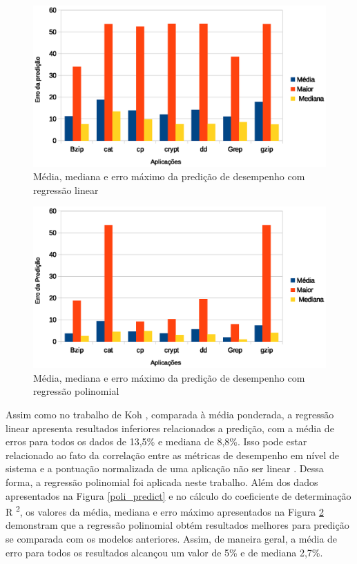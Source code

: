 \begin{figure}[!htb]
\centering
\includegraphics[width=.5\textwidth]{graficos/linear_error.eps}
\caption{Média, mediana e erro máximo da predição de desempenho com regressão linear}
\label{linear_error}
\end{figure}  

\begin{figure}[!htb]
\centering
\includegraphics[width=.5\textwidth]{graficos/polinomial_error.eps}
\caption{Média, mediana e erro máximo da predição de desempenho com regressão polinomial}
\label{polinomial_error}
\end{figure}  


Assim como no trabalho de Koh \cite{koh2007}, comparada à média ponderada, a
regressão linear apresenta resultados inferiores relacionados a predição, com a
média de erros para todos os dados de 13,5\% e mediana de 8,8\%. Isso pode
estar relacionado ao fato da correlação entre as métricas de desempenho em
nível de sistema e a pontuação normalizada de uma aplicação não ser linear
\cite{koh2007}. Dessa forma, a regressão polinomial foi aplicada neste
trabalho. Além dos dados apresentados na Figura \ref{poli_predict} e no cálculo
do coeficiente de determinação R \textsuperscript{2}, os valores da média,
mediana e erro máximo apresentados na Figura \ref{polinomial_error} demonstram
que a regressão polinomial obtém resultados melhores para predição se comparada
com os modelos anteriores. Assim, de maneira geral, a média de erro para todos
os resultados alcançou um valor de 5\% e de mediana 2,7\%.

